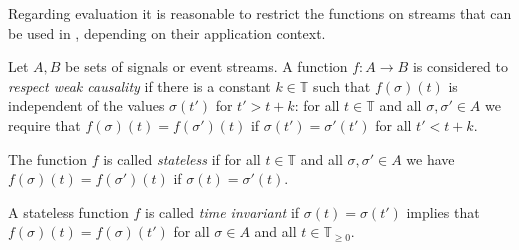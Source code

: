 Regarding evaluation it is reasonable to restrict the functions on streams that can be used in \tessla, depending on their application context.

\begin{definition}
Let $A,B$ be sets of signals or event streams.
A function $f: A → B$ is considered to \emph{respect weak causality} if there is a constant $k∈𝕋$ such that $f(σ)(t)$ is independent of the values $σ(t')$ for $t'>t+k$:
for all $t∈𝕋$ and all $σ,σ'∈A$ we require that $f(σ)(t) = f(σ')(t)$ if $σ(t')=σ'(t')$ for all $t'<t+k$.

The function $f$ is called \emph{stateless} if for all $t∈𝕋$ and all $σ,σ'∈A$ we have $f(σ)(t) = f(σ')(t)$ if $σ(t) = σ'(t)$.

A stateless function $f$ is called \emph{time invariant} if $σ(t) = σ(t')$ implies that $f(σ)(t) = f(σ)(t')$ for all $σ∈A$ and all $t∈𝕋_{≥0}$.
\end{definition}


